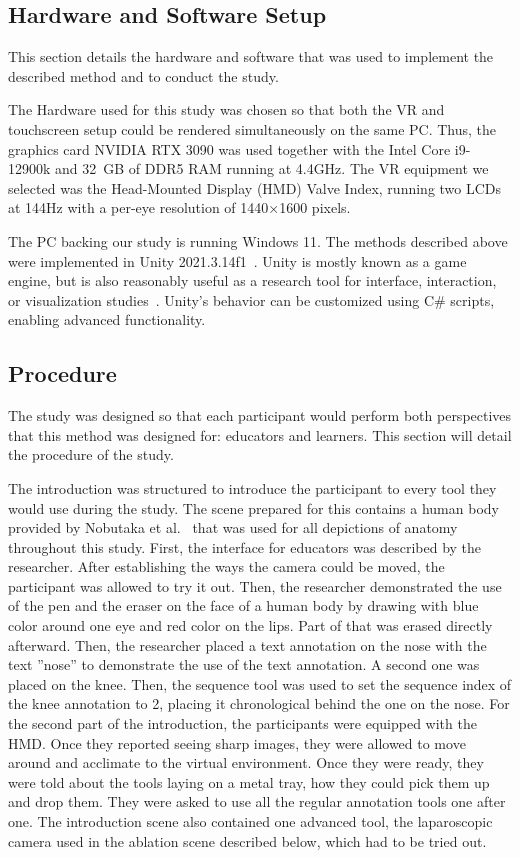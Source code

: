 \subsection{Hardware and Software Setup}
This section details the hardware and software that was used to implement the described method and to conduct the study. 

 The Hardware used for this study was chosen so that both the VR and touchscreen setup could be rendered simultaneously on the same PC. Thus, the graphics card NVIDIA RTX 3090 was used together with the Intel Core i9-12900k and 32~GB of DDR5 RAM running at 4.4GHz. The VR equipment we selected was the Head-Mounted Display (HMD) Valve Index, running two LCDs at 144Hz with a per-eye resolution of 1440×1600 pixels.

 The PC backing our study is running Windows 11. The methods described above were implemented in Unity 2021.3.14f1~\cite{unity}. Unity is mostly known as a game engine, but is also reasonably useful as a research tool for interface, interaction, or visualization studies~\cite{unityInterface1, unityInterface2, unityInterface3}. Unity's behavior can be customized using C\# scripts, enabling advanced functionality.


\subsection{Procedure}

The study was designed so that each participant would perform both perspectives that this method was designed for: educators and learners. This section will detail the procedure of the study.

 The introduction was structured to introduce the participant to every tool they would use during the study. The scene prepared for this contains a human body provided by Nobutaka et al.~\cite{bodyparts3d} that was used for all depictions of anatomy throughout this study. First, the interface for educators was described by the researcher. After establishing the ways the camera could be moved, the participant was allowed to try it out. Then, the researcher demonstrated the use of the pen and the eraser on the face of a human body by drawing with blue color around one eye and red color on the lips. Part of that was erased directly afterward. Then, the researcher placed a text annotation on the nose with the text ''nose'' to demonstrate the use of the text annotation. A second one was placed on the knee. Then, the sequence tool was used to set the sequence index of the knee annotation to 2, placing it chronological behind the one on the nose.
%
For the second part of the introduction, the participants were equipped with the HMD. Once they reported seeing sharp images, they were allowed to move around and acclimate to the virtual environment. Once they were ready, they were told about the tools laying on a metal tray, how they could pick them up and drop them. They were asked to use all the regular annotation tools one after one. The introduction scene also contained one advanced tool, the laparoscopic camera used in the ablation scene described below, which had to be tried out.

